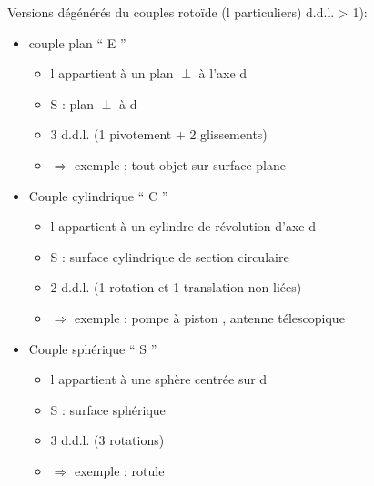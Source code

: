 Versions {\color{red}dégénérés} du couples rotoïde (l particuliers) d.d.l. > 1):\\
\begin{itemize}
\renewcommand{\labelitemi}{$\circ$}
\renewcommand{\labelitemii}{$\cdot$}
\item{{\color{orange}couple plan “ E ”}}
\begin{itemize}
\item{l appartient à un plan $\perp$ à l’axe d}
\item{S : plan $\perp$ à d}
\item{3 d.d.l. (1 pivotement + 2 glissements)}
\item{$\Rightarrow$ exemple : tout objet sur surface plane}
\end{itemize}
\item{{\color{orange}Couple cylindrique “ C ”}}
\begin{itemize}
\item{l appartient à un cylindre de révolution d’axe d}
\item{S : surface cylindrique de section circulaire}
\item{2 d.d.l. (1 rotation et 1 translation non liées)}
\item{$\Rightarrow$ exemple : pompe à piston , antenne télescopique}
\end{itemize}
\item{{\color{orange}Couple sphérique “ S ”}}
\begin{itemize}
\item{l appartient à une sphère centrée sur d}
\item{S : surface sphérique}
\item{3 d.d.l. (3 rotations)}
\item{$\Rightarrow$ exemple : rotule}\\
\end{itemize}
\end{itemize}

